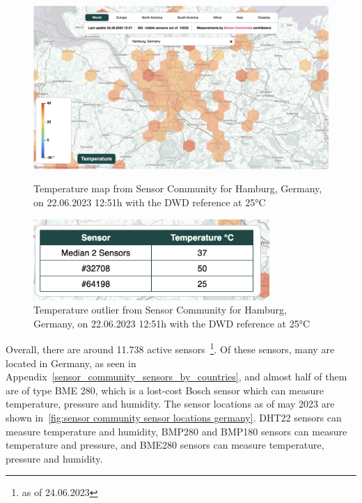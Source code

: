 \begin{figure}[ht]
    \centering
    \includegraphics[width=1\textwidth]{images/sensor_community_temperature_map.png}
    \caption{Temperature map from Sensor Community for Hamburg, Germany, on 22.06.2023 12:51h with the DWD reference at 25°C}
    \label{fig:temperature_sensor_community_map}

    \includegraphics[width=0.8\textwidth]{images/sensor_community_outliers.png}
    \caption{Temperature outlier from Sensor Community for Hamburg, Germany, on 22.06.2023 12:51h with the DWD reference at 25°C}
    \label{fig:temperature_sensor_community_outlier}
\end{figure}

Overall, there are around 11.738 active sensors~\footnote{as of 24.06.2023}. Of these sensors, many are located in Germany, as seen in Appendix~\ref{sensor_community_sensors_by_countries}, and almost half of them are of type BME 280, which is a lost-cost Bosch sensor which can measure temperature, pressure and humidity. The sensor locations as of may 2023 are shown in~\ref{fig:sensor community sensor locations germany}. DHT22 sensors can measure temperature and humidity, BMP280 and BMP180 sensors can measure temperature and pressure, and BME280 sensors can measure temperature, pressure and humidity.\\


